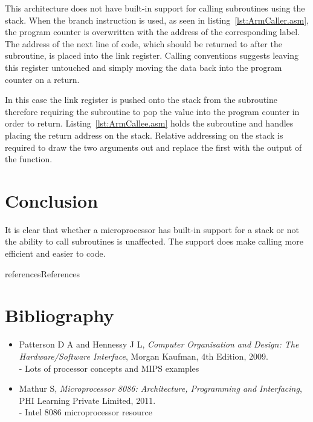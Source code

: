 \documentclass[12pt,a4paper]{article}
\begin{document}
This architecture does not have built-in support for calling subroutines using the stack.
When the branch instruction is used, as seen in listing~\ref{lst:ArmCaller.asm}, the program counter is overwritten with the address of the corresponding label.
The address of the next line of code, which should be returned to after the subroutine, is placed into the link register.
Calling conventions suggests leaving this register untouched and simply moving the data back into the program counter on a return.


In this case the link register is pushed onto the stack from the subroutine therefore requiring the subroutine to pop the value into the program counter in order to return.
Listing~\ref{lst:ArmCallee.asm} holds the subroutine and handles placing the return address on the stack.
Relative addressing on the stack is required to draw the two arguments out and replace the first with the output of the function.







\section{Conclusion}

It is clear that whether a microprocessor has built-in support for a stack or not the ability to call subroutines is unaffected.
The support does make calling more efficient and easier to code. 

\newpage


{references}{References}

\makeatletter 
	\renewcommand\@biblabel[1]{\textbullet}
\makeatother

\section*{Bibliography}

\begin{itemize}
   \item{
      Patterson D A and Hennessy J L,
      \emph{Computer Organisation and Design: The Hardware/Software Interface},
      Morgan Kaufman,
      4th Edition,
      2009.\\
      - Lots of processor concepts and MIPS examples
   }
   \item{
      Mathur S,
      \emph{Microprocessor 8086: Architecture, Programming and Interfacing},
      PHI Learning Private Limited,
      2011.\\
      - Intel 8086 microprocessor resource
   }
\end{itemize}
\end{document}
